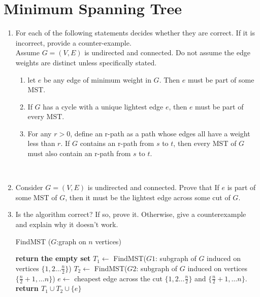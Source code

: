 \documentclass{article}
\begin{document}
\section{Minimum Spanning Tree}
\doublespacing
\begin{enumerate}
    \item For each of the following statements decides whether they are correct. If it is incorrect, provide a counter-example. \\
    Assume $G=(V,E)$ is undirected and connected. Do not assume the edge weights are distinct unless specifically stated.
    \begin{enumerate}
        \item let $e$ be any edge of minimum weight in $G$. Then $e$ must be part of some MST.
        \item If $G$ has a cycle with a unique lightest edge $e$, then $e$ must be part of every MST.
        \item For any $r > 0$, define an r-path as a path whose edges all have a weight less than $r$. If $G$ contains an r-path from $s$ to $t$, then every MST of $G$ must also contain an r-path from $s$ to $t$.
    \end{enumerate}
    \newpage
    \
    \\
    \newpage

    \item Consider $G=(V,E)$ is undirected and connected. Prove that If $e$ is part of some MST of $G$, then it must be the lightest edge across some cut of $G$.
    \newpage
    


    \item Is the algorithm correct? If so, prove it. Otherwise, give a counterexample and explain why it doesn’t work.
    \begin{algorithm}
    \caption{FindMST ($G$:graph on $n$ vertices)}\label{alg:cap}
    \begin{algorithmic}
      \textbf{return the empty set}
    \EndIf
    \State $T_1 \gets $ FindMST($G1$: subgraph of $G$ induced on vertices $\{ 1,2\dots \frac{n}{2}\}$)
    \State $T_2 \gets $ FindMST($G2$: subgraph of $G$ induced on vertices $\{\frac{n}{2}+1,\dots n\}$)
    \State $e \gets $ cheapest edge across the cut $\{1,2\dots \frac{n}{2}\}$ and $\{\frac{n}{2}+1,\dots n\}$.\\
    \textbf{return $T_1 \cup T_2 \cup \{e\}$}
    \end{algorithmic}
    \end{algorithm}
    \newpage


    
    
\end{enumerate}
\end{document}
